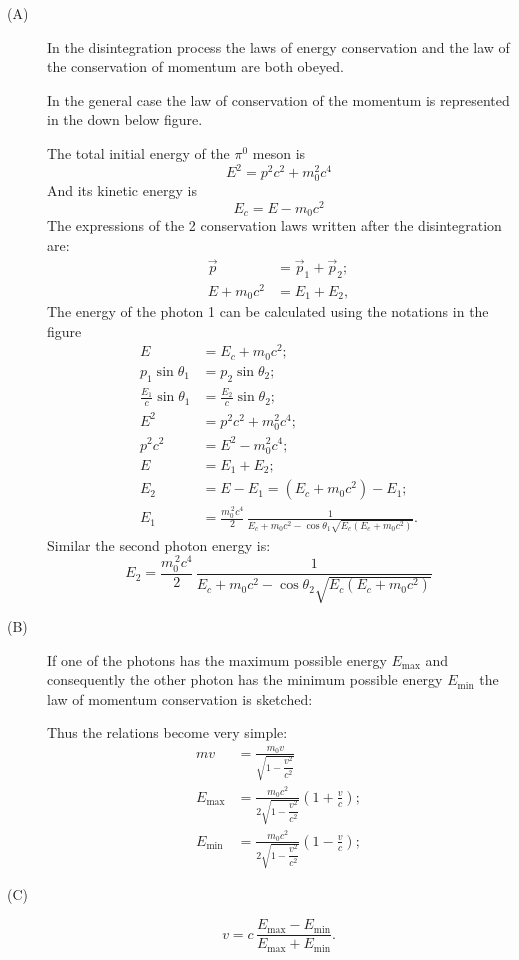 \begin{description}
\item[(A)] In the disintegration process the laws of energy conservation and
the law of the conservation of momentum are both obeyed.

In the general case the law of conservation of the momentum is represented in
the down below figure.

The total initial energy of the $\pi^0$ meson is
\[
E^2 = p^2c^2 + m_0^2c^4
\]
And its kinetic energy is
\[
E_c = E - m_0 c^2
\]
The expressions of the 2 conservation laws written after the disintegration
are:
\begin{align*}
\vec{p} &= \vec{p}_1 + \vec{p}_2;\\
E + m_0 c^2 &= E_1 + E_2,
\end{align*}
The energy of the photon 1 can be calculated using the notations in the figure
\begin{align*}
E &= E_c + m_0 c^2;\\
p_1\sin\theta_1 &= p_2\sin\theta_2;\\
\frac{E_1}{c}\sin\theta_1 &= \frac{E_2}{c}\sin\theta_2;\\
E^2 &= p^2c^2 + m_0^2c^4;\\
p^2c^2 &= E^2 - m_0^2c^4;\\
E &= E_1 + E_2;\\
E_2 &= E - E_1 = \left(E_c + m_0c^2\right) - E_1;\\
E_1 &= \frac{m_0^{\,2}c^4}{2}\,
  \frac{1}{E_c + m_0c^2 - \cos\theta_1\sqrt{E_c\left(E_c + m_0c^2\right)}}.
\end{align*}
Similar the second photon energy is:
\[
E_2 = \frac{m_0^{\,2}c^4}{2}\,
  \frac{1}{E_c + m_0c^2 - \cos\theta_2\sqrt{E_c\left(E_c + m_0c^2\right)}}
\]

\item[(B)] If one of the photons has the maximum possible energy
$E_{\mathrm{max}}$ and consequently the other photon has the minimum possible
energy $E_{\mathrm{min}}$ the law of momentum conservation is sketched:

Thus the relations become very simple:
\begin{align*}
mv &= \frac{m_0 v}{\sqrt{1 - \dfrac{v^2}{c^2}}}\\
E_{\mathrm{max}} &= \frac{m_0 c^2}{2\sqrt{1 - \dfrac{v^2}{c^2}}}
  \left(1 + \frac{v}{c}\right);\\
E_{\mathrm{min}} &= \frac{m_0 c^2}{2\sqrt{1 - \dfrac{v^2}{c^2}}}
  \left(1 - \frac{v}{c}\right);
\end{align*}

\item[(C)]
\[
v = c\,\frac{E_{\mathrm{max}} - E_{\mathrm{min}}}
            {E_{\mathrm{max}} + E_{\mathrm{min}}}.
\]
\end{description}

